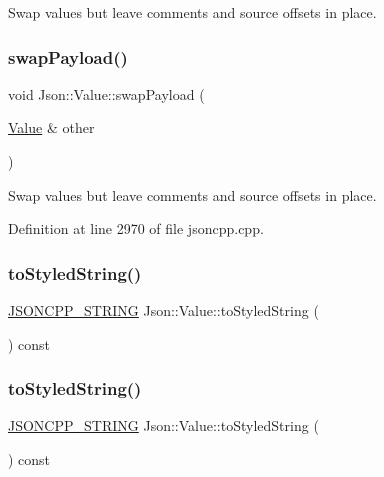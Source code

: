 Swap values but leave comments and source offsets in place. 

\hypertarget{class_json_1_1_value_a5263476047f20e2fc6de470e4de34fe5}{}\label{class_json_1_1_value_a5263476047f20e2fc6de470e4de34fe5} 
\subsubsection{\texorpdfstring{swap\+Payload()}{swapPayload()}\hspace{0.1cm}{\footnotesize\ttfamily [2/2]}}
{\footnotesize\ttfamily void Json\+::\+Value\+::swap\+Payload (\begin{DoxyParamCaption}\item[{\hyperlink{class_json_1_1_value}{Value} \&}]{other }\end{DoxyParamCaption})}



Swap values but leave comments and source offsets in place. 



Definition at line 2970 of file jsoncpp.\+cpp.

\hypertarget{class_json_1_1_value_a00154cc8662d7a845ed59e175c2496cb}{}\label{class_json_1_1_value_a00154cc8662d7a845ed59e175c2496cb} 
\subsubsection{\texorpdfstring{to\+Styled\+String()}{toStyledString()}\hspace{0.1cm}{\footnotesize\ttfamily [1/2]}}
{\footnotesize\ttfamily \hyperlink{config_8h_a1e723f95759de062585bc4a8fd3fa4be}{J\+S\+O\+N\+C\+P\+P\+\_\+\+S\+T\+R\+I\+NG} Json\+::\+Value\+::to\+Styled\+String (\begin{DoxyParamCaption}{ }\end{DoxyParamCaption}) const}

\hypertarget{class_json_1_1_value_a00154cc8662d7a845ed59e175c2496cb}{}\label{class_json_1_1_value_a00154cc8662d7a845ed59e175c2496cb} 
\subsubsection{\texorpdfstring{to\+Styled\+String()}{toStyledString()}\hspace{0.1cm}{\footnotesize\ttfamily [2/2]}}
{\footnotesize\ttfamily \hyperlink{config_8h_a1e723f95759de062585bc4a8fd3fa4be}{J\+S\+O\+N\+C\+P\+P\+\_\+\+S\+T\+R\+I\+NG} Json\+::\+Value\+::to\+Styled\+String (\begin{DoxyParamCaption}{ }\end{DoxyParamCaption}) const}



